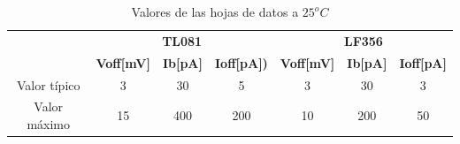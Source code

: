 \begin{table}[h]
\centering
\begin{tabular}{c|ccc|ccc}
\toprule
               & \multicolumn{3}{c|}{\textbf{TL081}}            & \multicolumn{3}{c}{\textbf{LF356}}    \\
               & \textbf{Voff[mV]} & \textbf{Ib[pA]} & \textbf{Ioff[pA])} & \textbf{Voff[mV]} & \textbf{Ib[pA]} & \textbf{Ioff[pA]} \\
\hline
Valor t\'ipico & 3            & 30        & 5         & 3            & 30    & 3     \\
Valor m\'aximo & 15            & 400       & 200       & 10           & 200   & 50   \\
\hline
\end{tabular}
\caption{Valores de las hojas de datos a $25^oC$}
\label{tab:ej2datasheet1}
\end{table}

